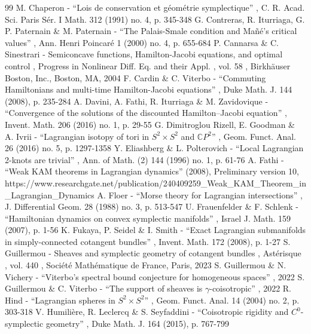 \begin{thebibliography}{99}
 M. Chaperon - “Lois de conservation et géométrie symplectique” , C. R. Acad. Sci. Paris Sér. I Math. 312 (1991) no. 4, p. 345-348
 G. Contreras, R. Iturriaga, G. P. Paternain \& M. Paternain - “The Palais-Smale condition and Mañé’s critical values” , Ann. Henri Poincaré 1 (2000) no. 4, p. 655-684
 P. Cannarsa \& C. Sinestrari - Semiconcave functions, Hamilton-Jacobi equations, and optimal control , Progress in Nonlinear Diff. Eq. and their Appl. , vol. 58 , Birkhäuser Boston, Inc., Boston, MA, 2004
 F. Cardin \& C. Viterbo - “Commuting Hamiltonians and multi-time Hamilton-Jacobi equations” , Duke Math. J. 144 (2008), p. 235-284
 A. Davini, A. Fathi, R. Iturriaga \& M. Zavidovique - “Convergence of the solutions of the discounted Hamilton–Jacobi equation” , Invent. Math. 206 (2016) no. 1, p. 29-55
 G. Dimitroglou Rizell, E. Goodman \& A. Ivrii - “Lagrangian isotopy of tori in ${S^2\times S^2}$ and ${{\mathbb{C}}P^2}$” , Geom. Funct. Anal. 26 (2016) no. 5, p. 1297-1358
 Y. Eliashberg \& L. Polterovich - “Local Lagrangian 2-knots are trivial” , Ann. of Math. (2) 144 (1996) no. 1, p. 61-76
 A. Fathi - “Weak KAM theorems in Lagrangian dynamics” (2008), Preliminary version 10, https://www.researchgate.net/publication/240409259\_Weak\_KAM\_Theorem\_in\_Lagrangian\_Dynamics
 A. Floer - “Morse theory for Lagrangian intersections” , J. Differential Geom. 28 (1988) no. 3, p. 513-547
 U. Frauenfelder \& F. Schlenk - “Hamiltonian dynamics on convex symplectic manifolds” , Israel J. Math. 159 (2007), p. 1-56
 K. Fukaya, P. Seidel \& I. Smith - “Exact Lagrangian submanifolds in simply-connected cotangent bundles” , Invent. Math. 172 (2008), p. 1-27
 S. Guillermou - Sheaves and symplectic geometry of cotangent bundles , Astérisque , vol. 440 , Société Mathématique de France, Paris, 2023
 S. Guillermou \& N. Vichery - “Viterbo’s spectral bound conjecture for homogeneous spaces” , 2022
 S. Guillermou \& C. Viterbo - “The support of sheaves is $\gamma $-coisotropic” , 2022
 R. Hind - “Lagrangian spheres in $S^2\times S^2$” , Geom. Funct. Anal. 14 (2004) no. 2, p. 303-318
 V. Humilière, R. Leclercq \& S. Seyfaddini - “Coisotropic rigidity and $C^{0}$-symplectic geometry” , Duke Math. J. 164 (2015), p. 767-799

\end{thebibliography}

